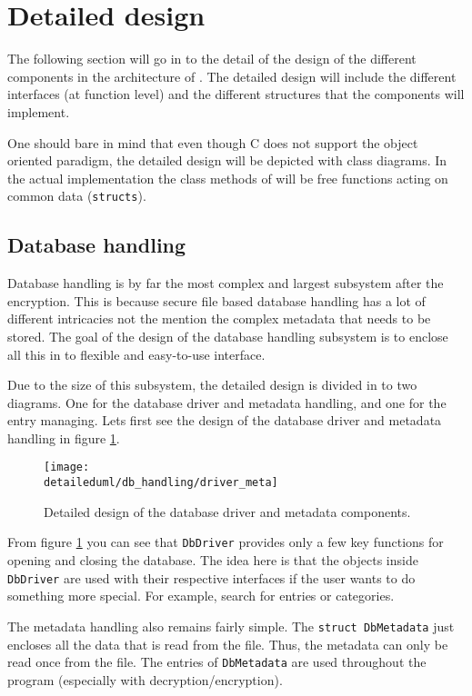 \section{Detailed design}

The following section will go in to the detail of the design of the different
components in the architecture of \pman. The detailed design will include the
different interfaces (at function level) and the different structures that the
components will implement.

One should bare in mind that even though C does not support the object oriented
paradigm, the detailed design will be depicted with class diagrams. In the
actual implementation the class methods of will be free functions acting on
common data (\texttt{structs}).

\subsection{Database handling}

Database handling is by far the most complex and largest subsystem after
the encryption. This is because secure file based database handling has a lot
of different intricacies not the mention the complex metadata that needs to
be stored. The goal of the design of the database handling subsystem is to
enclose all this in to flexible and easy-to-use interface.

Due to the size of this subsystem, the detailed design is divided in to two
diagrams. One for the database driver and metadata handling, and one for the
entry managing. Lets first see the design of the database driver and metadata
handling in figure \ref{dia:driver_meta}.

\begin{figure}[H]
    \centering
    \centerline{\texttt{[image: \\detaileduml/db\_handling/driver\_meta]}}
    \caption{Detailed design of the database driver and metadata components.}
    \label{dia:driver_meta}
\end{figure}

From figure \ref{dia:driver_meta} you can see that \texttt{DbDriver} provides
only a few key functions for opening and closing the database. The idea here is
that the objects inside \texttt{DbDriver} are used with their respective
interfaces if the user wants to do something more special. For example, search
for entries or categories.

The metadata handling also remains fairly simple. The \texttt{struct DbMetadata}
just encloses all the data that is read from the file. Thus, the metadata can
only be read once from the file. The entries of \texttt{DbMetadata} are used
throughout the program (especially with decryption/encryption).

